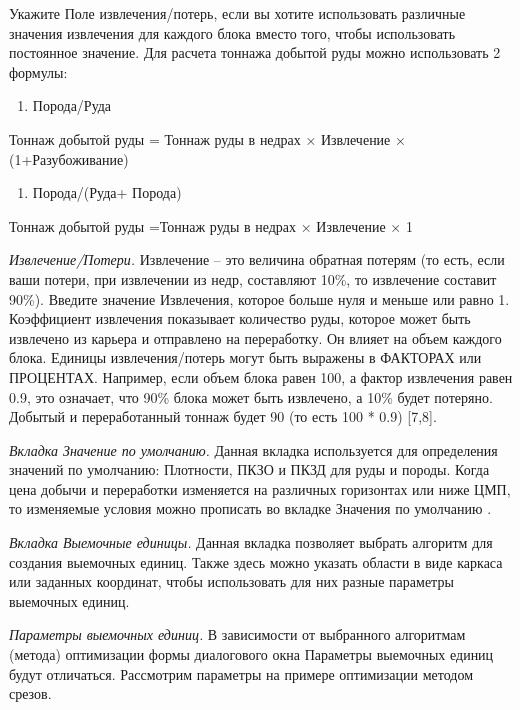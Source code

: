 \begin{multicols}{2}
Укажите Поле извлечения/потерь, если вы хотите использовать различные
значения извлечения для каждого блока вместо того, чтобы использовать
постоянное значение. Для расчета тоннажа добытой руды можно использовать
2 формулы:

\begin{enumerate}
\def\labelenumi{\arabic{enumi}.}
\item
  Порода/Руда
\end{enumerate}

Тоннаж добытой руды = Тоннаж руды в недрах × Извлечение ×
(1+Разубоживание)

\begin{enumerate}
\def\labelenumi{\arabic{enumi}.}
\setcounter{enumi}{1}
\item
  Порода/(Руда+ Порода)
\end{enumerate}

Тоннаж добытой руды =Тоннаж руды в недрах × Извлечение × 1

\emph{Извлечение/Потери.} Извлечение -- это величина обратная потерям
(то есть, если ваши потери, при извлечении из недр, составляют 10\%, то
извлечение составит 90\%). Введите значение Извлечения, которое больше
нуля и меньше или равно 1. Коэффициент извлечения показывает количество
руды, которое может быть извлечено из карьера и отправлено на
переработку. Он влияет на объем каждого блока. Единицы извлечения/потерь
могут быть выражены в ФАКТОРАХ или ПРОЦЕНТАХ. Например, если объем блока
равен 100, а фактор извлечения равен 0.9, это означает, что 90\% блока
может быть извлечено, а 10\% будет потеряно. Добытый и переработанный
тоннаж будет 90 (то есть 100 * 0.9) {[}7,8{]}.

\emph{Вкладка Значение по умолчанию.} Данная вкладка используется для
определения значений по умолчанию: Плотности, ПКЗО и ПКЗД для руды и
породы. Когда цена добычи и переработки изменяется на различных
горизонтах или ниже ЦМП, то изменяемые условия можно прописать во
вкладке Значения по умолчанию .

\emph{Вкладка Выемочные единицы.} Данная вкладка позволяет выбрать
алгоритм для создания выемочных единиц. Также здесь можно указать
области в виде каркаса или заданных координат, чтобы использовать для
них разные параметры выемочных единиц.

\emph{Параметры выемочных единиц.} В зависимости от выбранного
алгоритмам (метода) оптимизации формы диалогового окна Параметры
выемочных единиц будут отличаться. Рассмотрим параметры на примере
оптимизации методом срезов.


\end{multicols}
